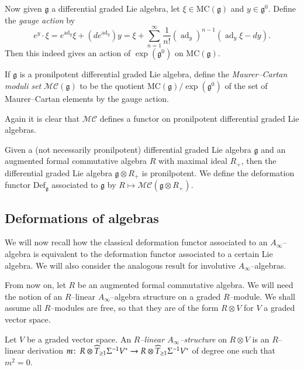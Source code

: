 \documentclass[british]{amsart}
\theoremstyle{plain}
\theoremstyle{definition}
{
\newaliascnt{{definition}}{theorem}\newtheorem{{definition}}[{definition}]{{Definition}}\aliascntresetthe{{definition}}\expandafterautorefname\endcsname{{Definition}}}
{
\newaliascnt{{remark}}{theorem}\newtheorem{{remark}}[{remark}]{{Remark}}\aliascntresetthe{{remark}}\expandafterautorefname\endcsname{{Remark}}}
{
\newaliascnt{{example}}{theorem}\newtheorem{{example}}[{example}]{{Example}}\aliascntresetthe{{example}}\expandafterautorefname\endcsname{{Example}}}
{
\newaliascnt{{examples}}{theorem}\newtheorem{{examples}}[{examples}]{{Examples}}\aliascntresetthe{{examples}}\expandafterautorefname\endcsname{{Examples}}}
{
\newaliascnt{{notation}}{theorem}\newtheorem{{notation}}[{notation}]{{Notation}}\aliascntresetthe{{notation}}\expandafterautorefname\endcsname{{Notation}}}
{
\newaliascnt{{convention}}{theorem}\newtheorem{{convention}}[{convention}]{{Convention}}\aliascntresetthe{{convention}}\expandafterautorefname\endcsname{{Convention}}}
\numberwithin{equation}{section}
\numberwithin{figure}{section}
\begin{document}
Now given $\mathfrak{g}$ a differential graded Lie algebra, let $\xi\in{\mathrm{MC}}(\mathfrak{g})$ and $y\in\mathfrak{g}^0$. Define the \emph{gauge action} by
\[
e^y\cdot \xi = e^{\operatorname{ad}_y}\xi + (de^{\operatorname{ad}_y})y = \xi + \sum_{n=1}^{\infty} \frac{1}{n!}(\operatorname{ad}_y)^{n-1}(\operatorname{ad}_y\xi-dy).
\]
Then this indeed gives an action of $\exp(\mathfrak{g}^0)$ on ${\mathrm{MC}}(\mathfrak{g})$.

\begin{definition}
If $\mathfrak{g}$ is a pronilpotent differential graded Lie algebra, define the \emph{Maurer--Cartan moduli set} ${\mathscr{MC}}(\mathfrak{g})$ to be the quotient ${\mathrm{MC}}(\mathfrak{g})/\exp(\mathfrak{g}^0)$ of the set of Maurer--Cartan elements by the gauge action.
\end{definition}

Again it is clear that ${\mathscr{MC}}$ defines a functor on pronilpotent differential graded Lie algebras.

Given a (not necessarily pronilpotent) differential graded Lie algebra $\mathfrak{g}$ and an augmented formal commutative algebra $R$ with maximal ideal $R_+$, then the differential graded Lie algebra $\mathfrak{g}\otimes R_+$ is pronilpotent. We define the deformation functor ${\mathrm{Def}}_{\mathfrak{g}}$ associated to $\mathfrak{g}$ by $R\mapsto {\mathscr{MC}}(\mathfrak{g}\otimes R_+)$.

\subsection{Deformations of algebras}
We will now recall how the classical deformation functor associated to an $A_\infty$--algebra is equivalent to the deformation functor associated to a certain Lie algebra. We will also consider the analogous result for involutive $A_\infty$--algebras.

From now on, let $R$ be an augmented formal commutative algebra. We will need the notion of an $R$--linear $A_\infty$--algebra structure on a graded $R$--module. We shall assume all $R$--modules are free, so that they are of the form $R\otimes V$ for $V$ a graded vector space.

\begin{definition}
Let $V$ be a graded vector space. An \emph{$R$--linear $A_\infty$--structure} on $R\otimes V$ is an $R$--linear derivation $m{\colon\thinspace} R \otimes \widehat{T}_{\geq 1}\Sigma^{-1}V^*\rightarrow R \otimes \widehat{T}_{\geq 1}\Sigma^{-1}V^*$ of degree one such that $m^2=0$.
\end{definition}
\end{document}
